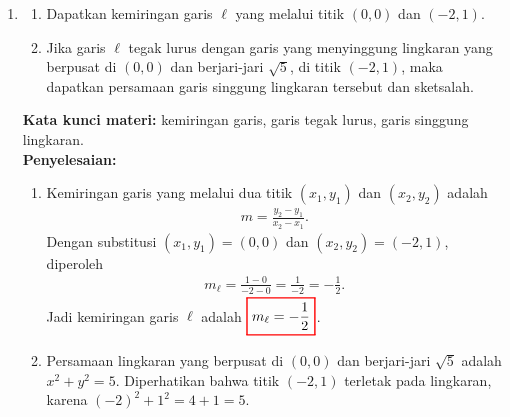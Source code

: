 \documentclass[10pt,openany,a4paper]{article}
\theoremstyle{definition}
\theoremstyle{definition}
\theoremstyle{plain}
\newenvironment{jawab}[2][tes]{%
\par\noindent\textbf{Kata kunci materi:} #1.\\
\textbf{Penyelesaian:} #2%
}{}
\begin{document}
\begin{enumerate}
\begin{jawab}[pertidaksamaan rasional, faktorisasi, garis bilangan, notasi interval]
{\begin{center}
                \end{center}
                Karena yang diminta adalah nilai yang lebih dari atau sama dengan nol, diambil interval yang bertanda positif beserta pembuat nol dari pembilang ($x=-3$ dan $x=4$). Pembuat nol dari penyebut ($x=-5$ dan $x=2$) tidak diikutkan karena membuat ekspresi tidak terdefinisi. Jadi penyelesaian dari pertidaksamaan tersebut adalah $\colorlet{oldcolor}{.}
        \color{red}
        \setlength{\fboxrule}{1pt} \boxed{\color{oldcolor}(-\infty, -5) \cup [-3, 2) \cup [4, \infty)}\color{oldcolor}$.
            }
            \end{jawab}
            \item \begin{enumerate}
                \item Dapatkan kemiringan garis $\ell$ yang melalui titik $(0,0)$ dan $(-2,1)$.
                \item Jika garis $\ell$ tegak lurus dengan garis yang menyinggung lingkaran yang berpusat di $(0,0)$ dan berjari-jari $\sqrt{5}$, di titik $(-2,1)$, maka dapatkan persamaan garis singgung lingkaran tersebut dan sketsalah.
            \end{enumerate}
            \begin{jawab}[kemiringan garis, garis tegak lurus, garis singgung lingkaran]{
                \begin{enumerate}
                    \item Kemiringan garis yang melalui dua titik $(x_1,y_1)$ dan $(x_2,y_2)$ adalah
                    \begin{align*}
                        m = \frac{y_2 - y_1}{x_2 - x_1}.
                    \end{align*}
                    Dengan substitusi $(x_1,y_1)=(0,0)$ dan $(x_2,y_2)=(-2,1)$, diperoleh
                    \begin{align*}
                        m_\ell = \frac{1 - 0}{-2 - 0} = \frac{1}{-2} = -\frac{1}{2}.
                    \end{align*}
                    Jadi kemiringan garis $\ell$ adalah $\colorlet{oldcolor}{.}
        \color{red}
        \setlength{\fboxrule}{1pt} \boxed{\color{oldcolor}m_\ell = -\frac{1}{2}}\color{oldcolor}$.
                    \item Persamaan lingkaran yang berpusat di $(0,0)$ dan berjari-jari $\sqrt{5}$ adalah $x^2 + y^2 = 5$. Diperhatikan bahwa titik $(-2,1)$ terletak pada lingkaran, karena $(-2)^2 + 1^2 = 4 + 1 = 5$. \\

\end{enumerate}}
\end{jawab}
\end{enumerate}
\end{document}
